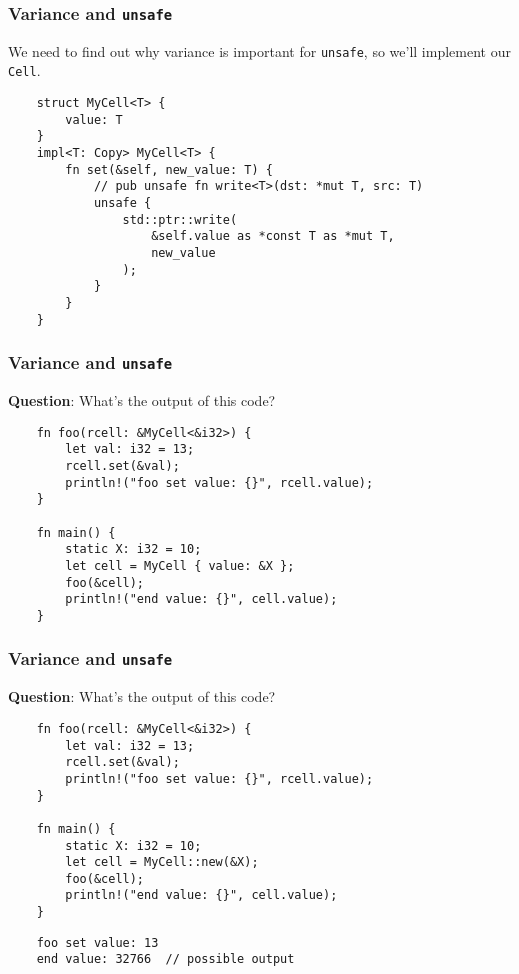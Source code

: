 \documentclass[aspectratio=1610,t]{beamer}
\begin{document}

\begin{frame}[fragile]
\frametitle{Variance and \texttt{unsafe}}
We need to find out why variance is important for \texttt{unsafe}, so we'll implement our \texttt{Cell}.

\begin{verbatim}
    struct MyCell<T> {
        value: T
    }
    impl<T: Copy> MyCell<T> {
        fn set(&self, new_value: T) {
            // pub unsafe fn write<T>(dst: *mut T, src: T)
            unsafe {
                std::ptr::write(
                    &self.value as *const T as *mut T,
                    new_value
                );
            }
        }
    }
\end{verbatim}
\end{frame}


\begin{frame}[fragile]
\frametitle{Variance and \texttt{unsafe}}
\textbf{Question}: What's the output of this code?

\begin{verbatim}
    fn foo(rcell: &MyCell<&i32>) { 
        let val: i32 = 13;
        rcell.set(&val);
        println!("foo set value: {}", rcell.value);
    }

    fn main() {
        static X: i32 = 10;
        let cell = MyCell { value: &X };
        foo(&cell);
        println!("end value: {}", cell.value);
    }
\end{verbatim}
\end{frame}


\begin{frame}[fragile]
\frametitle{Variance and \texttt{unsafe}}
\textbf{Question}: What's the output of this code?

\begin{verbatim}
    fn foo(rcell: &MyCell<&i32>) { 
        let val: i32 = 13;
        rcell.set(&val);
        println!("foo set value: {}", rcell.value);
    }

    fn main() {
        static X: i32 = 10;
        let cell = MyCell::new(&X);
        foo(&cell);
        println!("end value: {}", cell.value);
    }
\end{verbatim}

\begin{verbatim}
    foo set value: 13
    end value: 32766  // possible output
\end{verbatim}
\end{frame}
\end{document}
